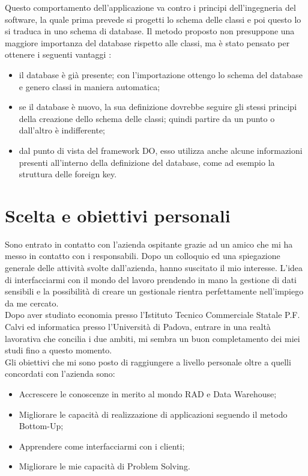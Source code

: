 Questo comportamento dell'applicazione va contro i principi dell'ingegneria del software, la quale prima prevede si progetti lo schema delle classi e poi questo lo si traduca in uno schema di database. Il metodo proposto non presuppone una maggiore importanza del database rispetto alle classi, ma è stato pensato per ottenere i seguenti vantaggi \hyperref[bib11]{\cite{[11]}}:
\begin{itemize}
	\item il database è già presente; con l'importazione ottengo lo schema del database e genero classi in maniera automatica;
	\item se il database è nuovo, la sua definizione dovrebbe seguire gli stessi principi della	creazione dello schema delle classi; quindi partire da un punto o dall'altro è indifferente;
	\item dal punto di vista del framework DO, esso utilizza anche alcune informazioni presenti all'interno della definizione del database, come ad esempio la struttura delle
	foreign key.
\end{itemize}


\section{Scelta e obiettivi personali}\label{scelta e obiettivi}
Sono entrato in contatto con l'azienda ospitante grazie ad un amico che mi ha messo in contatto con i responsabili. Dopo un colloquio ed una spiegazione generale delle attività svolte dall'azienda, hanno suscitato il mio interesse. L'idea di interfacciarmi con il mondo del lavoro prendendo in mano la gestione di dati sensibili e la possibilità di creare un gestionale rientra perfettamente nell'impiego da me cercato.\\
Dopo aver studiato economia presso l'Istituto Tecnico Commerciale Statale P.F. Calvi ed informatica presso l'Università di Padova, entrare in una realtà lavorativa che concilia i due ambiti, mi sembra un buon completamento dei miei studi fino a questo momento.\\
Gli obiettivi che mi sono posto di raggiungere a livello personale oltre a quelli concordati con l'azienda sono: 
\begin{itemize}
	\item Accrescere le conoscenze in merito al mondo RAD e Data Warehouse;
	\item Migliorare le capacità di realizzazione di applicazioni seguendo il metodo Bottom-Up;
	\item Apprendere come interfacciarmi con i clienti;
	\item Migliorare le mie capacità di Problem Solving.
\end{itemize}

\newpage
